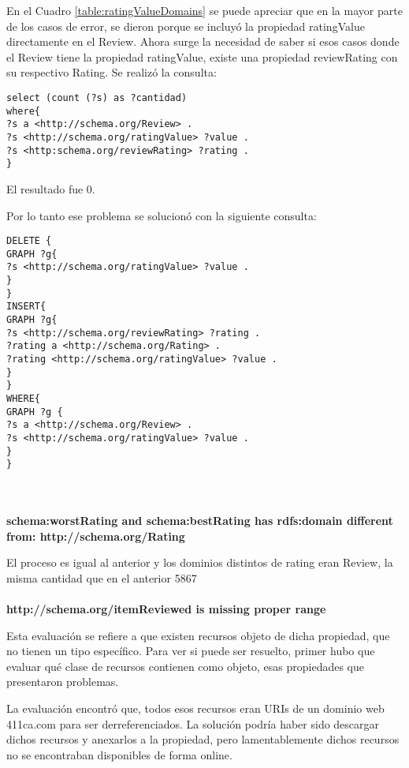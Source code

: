 En el Cuadro \ref{table:ratingValueDomains} se puede apreciar que en la mayor parte de los casos de error, se dieron porque se incluyó la propiedad ratingValue directamente en 
el Review. Ahora surge la necesidad de saber si esos casos donde el Review tiene la propiedad ratingValue, existe una propiedad reviewRating 
con su respectivo Rating.
Se realizó la consulta:

\begin{lstlisting}[frame=single]  
select (count (?s) as ?cantidad) 
where{
?s a <http://schema.org/Review> . 
?s <http://schema.org/ratingValue> ?value . 
?s <http:schema.org/reviewRating> ?rating . 
}
\end{lstlisting}

El resultado fue 0.

Por lo tanto ese problema se solucionó con la siguiente consulta:
\newpage
\begin{lstlisting}[frame=single]  
DELETE { 
GRAPH ?g{ 
?s <http://schema.org/ratingValue> ?value . 
} 
} 
INSERT{ 
GRAPH ?g{ 
?s <http://schema.org/reviewRating> ?rating . 
?rating a <http://schema.org/Rating> . 
?rating <http://schema.org/ratingValue> ?value . 
}
}
WHERE{
GRAPH ?g {
?s a <http://schema.org/Review> .
?s <http://schema.org/ratingValue> ?value .
}
}
\end{lstlisting}

~\\\\


\noindent\textbf{ schema:worstRating and schema:bestRating has rdfs:domain different from: http://schema.org/Rating}

El proceso es igual al anterior y los dominios distintos de rating eran Review, la misma cantidad que en el anterior 5867
\\\\
\textbf{http://schema.org/itemReviewed is missing proper range}

Esta evaluación se refiere a que existen recursos objeto de dicha propiedad, que no tienen un tipo específico. Para ver si 
puede ser resuelto, primer hubo que evaluar qué clase de recursos contienen como objeto, esas propiedades que presentaron problemas.

La evaluación encontró que, todos esos recursos eran URIs de un dominio web 411ca.com para ser derreferenciados. La solución podría haber sido 
descargar dichos recursos y anexarlos a la propiedad, pero lamentablemente dichos recursos no se encontraban disponibles de forma online.

